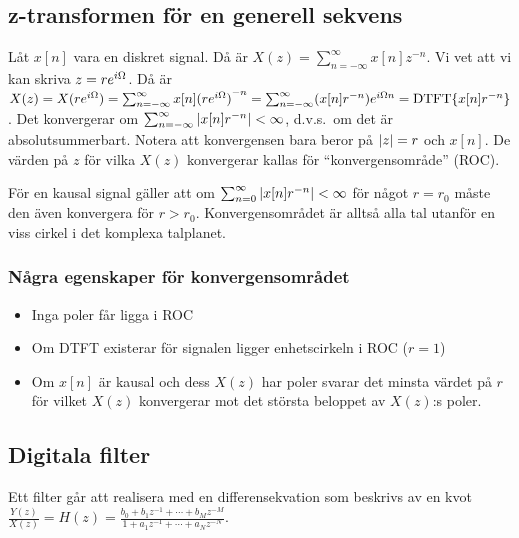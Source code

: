 \documentclass[a4paper]{article}
\begin{document}
\providecommand\fname{}
\renewcommand\fname{19-10-17}

\subsection{z-transformen för en generell sekvens}
Låt \(
    x[n]
\) vara en diskret signal. Då är \(
    X(z) = \sum_{n=-\infty}^\infty x[n]z^{-n}
\). Vi vet att vi kan skriva \(
    z = re^{{i\Omega}}
\). Då är \(
    X(z) = X(re^{i\Omega}) = \sum_{n=-\infty}^\infty x[n] {(re^{{i\Omega}})}^{-n}
        = \sum_{n=-\infty}^\infty (x[n] r^{-n}) e^{{i\Omega} n}
        = \text{DTFT} \{x[n] r^{-n}\}
\). Det konvergerar om \(
    \sum_{n=-\infty}^\infty \abs{x[n] r^{-n}} < \infty
\), d.v.s.\ om det är absolutsummerbart. Notera att konvergensen bara beror 
på \(
    \abs{z} = r
\) och \(
    x[n]
\). De värden på \(
    z
\) för vilka \(
    X(z)
\) konvergerar kallas för \enquote{konvergensområde} (ROC).

För en kausal signal gäller att om \(
    \sum_{n=0}^\infty \abs{x[n] r^{-n}} < \infty
\) för något \(
    r = r_0
\) måste den även konvergera för \(
    r > r_0
\). Konvergensområdet är alltså alla tal utanför en viss cirkel i det 
komplexa talplanet.

\subsubsection{Några egenskaper för konvergensområdet}
\begin{itemize}
    \item Inga poler får ligga i ROC
    \item Om DTFT existerar för signalen ligger enhetscirkeln i ROC (\(
              r=1
          \))
    \item Om \(
              x[n]
          \) är kausal och dess \(
              X(z)
          \) har poler svarar det minsta värdet på \(
              r
          \) för vilket \(
              X(z)
          \) konvergerar mot det största beloppet av \(
              X(z)
          \):s poler.
\end{itemize}

\subsection{Digitala filter}
Ett filter går att realisera med en differensekvation som beskrivs
av en kvot \(
    \frac{Y(z)}{X(z)} = H(z) 
        = \frac{b_0 + b_1 z^{-1} + \cdots + b_M z^{-M}}{1 + a_1z^{-1} + \cdots + a_N z^{-N}} 
\).
\end{document}
